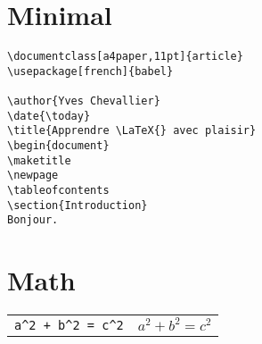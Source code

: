 \documentclass{article}
\begin{document}
\begin{multicols*}{3}
\section*{Minimal}

\begin{lstlisting}
\documentclass[a4paper,11pt]{article}
\usepackage[french]{babel}

\author{Yves Chevallier}
\date{\today}
\title{Apprendre \LaTeX{} avec plaisir}
\begin{document}
\maketitle
\newpage
\tableofcontents
\section{Introduction}
Bonjour.
\end{lstlisting}

\section*{Math}

\begin{tabularx}{\columnwidth}{Xl}
    \lstinline{a^2 + b^2 = c^2} & $a^2 + b^2 = c^2$ \\
\end{tabularx}

\begin{multicols*}{2}


\end{multicols*}
\end{multicols*}
\end{document}
